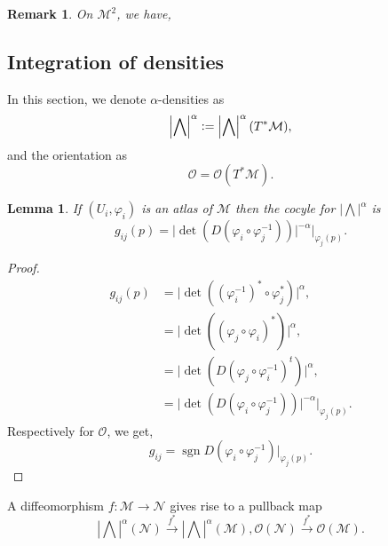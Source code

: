 \documentclass[10pt]{article}
\newtheorem{lemma}{Lemma}[section]
\newtheorem{remark}{Remark}[section]
\DeclareMathOperator{\grad}{grad}
\DeclareMathOperator{\divergence}{div}
\DeclareMathOperator{\sgn}{sgn}
\newcommand{\defeq}{\vcentcolon=}
\newcommand{\M}[0]{\mathcal{M}}
\newcommand{\maniN}[0]{\mathcal{N}}
\newcommand{\cinf}[0]{\mathcal{C}^\infty}
\begin{document}
\begin{remark}
  On $\M^2$, we have,
  \begin{center}
  \end{center}
\end{remark}
\subsection{Integration of densities}
In this section, we denote $\alpha$-densities as 
\begin{equation*}
  \left\vert\bigwedge\right\vert^\alpha\defeq \left\vert\bigwedge\right\vert^\alpha(T^*\M),
\end{equation*}
and the orientation as
\begin{equation*}
\mathcal{O} = \mathcal{O}(T^*\M).  
\end{equation*}
\begin{lemma}
  If $(U_i,\varphi_i)$ is an atlas of $\M$ then the cocyle for $\left\vert\bigwedge\right\vert^\alpha$ is 
  \begin{equation*}
    g_{ij}(p) = \vert \det(D(\varphi_i\circ\varphi_j^{-1}))\vert^{-\alpha}|_{\varphi_j(p)}.
  \end{equation*}
\end{lemma}
\begin{proof}
  \begin{align*}
    g_{ij}(p) & = \vert \det((\varphi_i^{-1})^*\circ\varphi_j^*)\vert^\alpha,\\
    &= \vert\det ((\varphi_j\circ\varphi_i)^*)\vert^\alpha,\\
    & = \vert\det(D(\varphi_j\circ\varphi_i^{-1})^t)\vert^\alpha,\\
    & = \vert \det(D(\varphi_i\circ\varphi_j^{-1}))\vert^{-\alpha}|_{\varphi_j(p)}.
  \end{align*}
  Respectively for $\mathcal{O}$, we get,
  \begin{equation*}
    g_{ij} = \sgn D(\varphi_i\circ\varphi_j^{-1})|_{\varphi_j(p)}.
  \end{equation*}
\end{proof}
A diffeomorphism $f:\M\to\maniN$ gives rise to a pullback map 
  \begin{equation*}
    \left\vert\bigwedge\right\vert^\alpha(\maniN)\stackrel{f^*}{\to}\left\vert\bigwedge\right\vert^\alpha(\M), \mathcal{O}(\maniN)\stackrel{f^*}{\to}\mathcal{O}(\M).
  \end{equation*}
\end{document}
